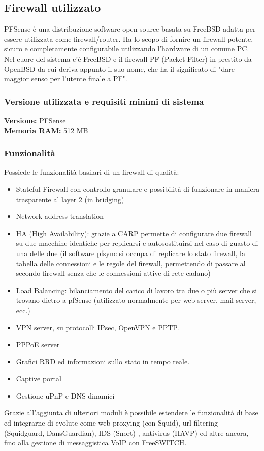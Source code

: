 \documentclass{article}
\begin{document}
\subsection{Firewall utilizzato}
PFSense è una distribuzione software open source basata su FreeBSD adatta per essere utilizzata come firewall/router. 
Ha lo scopo di fornire un firewall potente, sicuro e completamente configurabile utilizzando l'hardware di un comune PC. Nel cuore del sistema c'è FreeBSD e il firewall PF (Packet Filter) in prestito da OpenBSD da cui deriva appunto il suo nome, che ha il significato di "dare maggior senso per l'utente finale a PF".


\subsubsection{Versione utilizzata e requisiti minimi di sistema}
\textbf{Versione:} PFSense \\
\textbf{Memoria RAM:} 512 MB

\subsubsection{Funzionalità}
Possiede le funzionalità basilari di un firewall di qualità:

\begin{itemize}
    \item Stateful Firewall con controllo granulare e possibilità di funzionare in maniera trasparente al layer 2 (in bridging)
    \item Network address translation
    \item HA (High Availability): grazie a CARP permette di configurare due firewall su due macchine identiche per replicarsi e autosostituirsi nel caso di guasto di una delle due (il software pfsync si occupa di replicare lo stato firewall, la tabella delle connessioni e le regole del firewall, permettendo di passare al secondo firewall senza che le connessioni attive di rete cadano)
    \item Load Balancing: bilanciamento del carico di lavoro tra due o più server che si trovano dietro a pfSense (utilizzato normalmente per web server, mail server, ecc.)
    \item VPN server, su protocolli IPsec, OpenVPN e PPTP.
    \item PPPoE server
    \item Grafici RRD ed informazioni sullo stato in tempo reale.
    \item Captive portal
    \item Gestione uPnP e DNS dinamici
\end{itemize}
Grazie all'aggiunta di ulteriori moduli è possibile estendere le funzionalità di base ed integrarne di evolute come web proxying (con Squid), url filtering (Squidguard, DansGuardian), IDS (Snort) , antivirus (HAVP) ed altre ancora, fino alla gestione di messaggistica VoIP con FreeSWITCH. 
\end{document}
